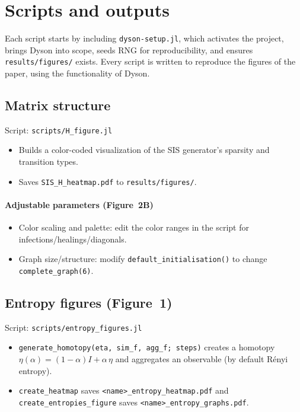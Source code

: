 \documentclass[11pt]{article}
\newcommand{\code}[1]{\texttt{#1}}
\newcommand{\pkg}[1]{\textsf{#1}}
\begin{document}
\section{Scripts and outputs}
Each script starts by including \code{dyson-setup.jl}, which activates the project, brings \pkg{Dyson} into scope, seeds RNG for reproducibility, and ensures \code{results/figures/} exists.
Every script is written to reproduce the figures of the paper, using the functionality of \pkg{Dyson}.

\subsection{Matrix structure}
  Script: \code{scripts/H\_figure.jl}
  \begin{itemize}
    \item Builds a color-coded visualization of the SIS generator's sparsity and transition types.
    \item Saves \code{SIS\_H\_heatmap.pdf} to \code{results/figures/}.
  \end{itemize}

  \paragraph{Adjustable parameters (Figure~2B)}
  \begin{itemize}
    \item Color scaling and palette: edit the color ranges in the script for infections/healings/diagonals.
    \item Graph size/structure: modify \code{default\_initialisation()} to change \code{complete\_graph(6)}.
  \end{itemize}

\subsection{Entropy figures (Figure~1)}
  Script: \code{scripts/entropy\_figures.jl}
  \begin{itemize}
    \item \code{generate\_homotopy(eta, sim\_f, agg\_f; steps)} creates a homotopy \(\eta(\alpha)=(1-\alpha)I+\alpha\,\eta\) and aggregates an observable (by default R\'enyi entropy).
    \item \code{create\_heatmap} saves \code{<name>\_entropy\_heatmap.pdf} and \code{create\_entropies\_figure} saves \code{<name>\_entropy\_graphs.pdf}.
  \end{itemize}
\end{document}
